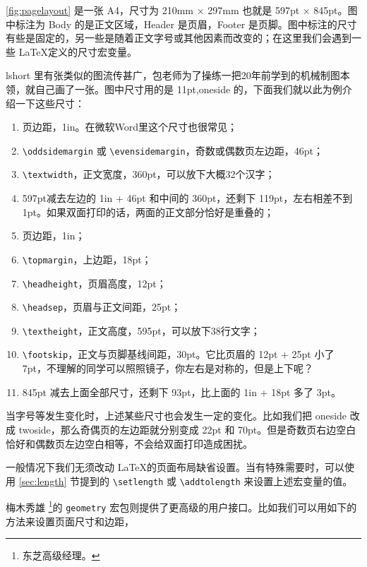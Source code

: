\autoref{fig:pagelayout} 是一张 A4，尺寸为 210mm × 297mm 也就是 597pt × 845pt。图中标注为 Body 的是正文区域，Header 是页眉，Footer 是页脚。图中标注的尺寸有些是固定的，另一些是随着正文字号或其他因素而改变的；在这里我们会遇到一些 \LaTeX 定义的尺寸宏变量。

lshort 里有张类似的图流传甚广，包老师为了操练一把20年前学到的机械制图本领，就自己画了一张。图中尺寸用的是 11pt,oneside 的，下面我们就以此为例介绍一下这些尺寸：

\begin{enumerate}
  \item 页边距，1in。在微软Word里这个尺寸也很常见；
  \item \verb|\oddsidemargin| 或 \verb|\evensidemargin|，奇数或偶数页左边距，46pt；
  \item \verb|\textwidth|，正文宽度，360pt，可以放下大概32个汉字；
  \item 597pt减去左边的 1in + 46pt 和中间的 360pt，还剩下 119pt，左右相差不到 1pt。如果双面打印的话，两面的正文部分恰好是重叠的；
  \item 页边距，1in；
  \item \verb|\topmargin|，上边距，18pt；
  \item \verb|\headheight|，页眉高度，12pt；
  \item \verb|\headsep|，页眉与正文间距，25pt；
  \item \verb|\textheight|，正文高度，595pt，可以放下38行文字；
  \item \verb|\footskip|，正文与页脚基线间距，30pt。它比页眉的 12pt + 25pt 小了 7pt，不理解的同学可以照照镜子，你左右是对称的，但是上下呢？
  \item 845pt 减去上面全部尺寸，还剩下 93pt，比上面的 1in + 18pt 多了 3pt。
\end{enumerate}

当字号等发生变化时，上述某些尺寸也会发生一定的变化。比如我们把 oneside 改成 twoside，那么奇偶页的左边距就分别变成 22pt 和 70pt。但是奇数页右边空白恰好和偶数页左边空白相等，不会给双面打印造成困扰。

一般情况下我们无须改动 \LaTeX 的页面布局缺省设置。当有特殊需要时，可以使用 \ref{sec:length} 节提到的 \verb|\setlength| 或 \verb|\addtolength| 来设置上述宏变量的值。

梅木秀雄\indexUmeki{} \footnote{东芝高级经理。}的 \texttt{geometry} 宏包\citep{Umeki_geometry}则提供了更高级的用户接口。比如我们可以用如下的方法来设置页面尺寸和边距，

\begin{Code}[]
\usepackage[paperwidth=100mm, paperheight=150mm, margin=20mm]{geometry}
\end{Code}

